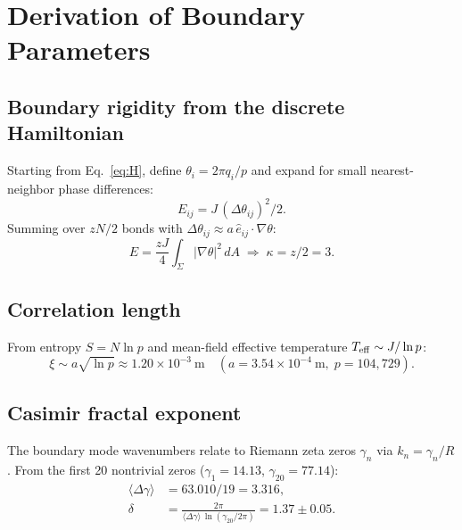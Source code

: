 \documentclass[aps,prd,twocolumn,superscriptaddress,longbibliography,nofootinbib]{revtex4-2}
\begin{document}
\appendix

\section{Derivation of Boundary Parameters}
\label{app:derivations}

\subsection{Boundary rigidity from the discrete Hamiltonian}

Starting from Eq.~\eqref{eq:H}, define $\theta_i = 2\pi q_i/p$ and expand
for small nearest-neighbor phase differences:
\begin{equation}
E_{ij} = J\,(\Delta\theta_{ij})^2/2.
\end{equation}
Summing over $zN/2$ bonds with $\Delta\theta_{ij} \approx a\,\hat{e}_{ij}\cdot\nabla\theta$:
\begin{equation}
E = \frac{zJ}{4}\int_\Sigma |\nabla\theta|^2\,dA
\;\Longrightarrow\; \kappa = z/2 = 3.
\end{equation}

\subsection{Correlation length}

From entropy $S = N\ln p$ and mean-field effective temperature $T_{\rm eff} \sim J/\ln p$:
\begin{equation}
\xi \sim a\sqrt{\ln p} \approx 1.20\times10^{-3}~\text{m}
\quad (a = 3.54\times10^{-4}~\text{m},\; p = 104{,}729).
\end{equation}

\subsection{Casimir fractal exponent}

The boundary mode wavenumbers relate to Riemann zeta zeros $\gamma_n$
via $k_n = \gamma_n/R$.  From the first 20 nontrivial zeros
($\gamma_1 = 14.13$, $\gamma_{20} = 77.14$):
\begin{align}
\langle\Delta\gamma\rangle &= 63.010/19 = 3.316, \\
\delta &= \frac{2\pi}{\langle\Delta\gamma\rangle\,\ln(\gamma_{20}/2\pi)} = 1.37 \pm 0.05.
\end{align}
\end{document}
